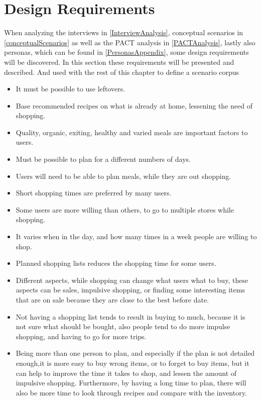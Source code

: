 \section{Design Requirements} \label{DesignRequirements}
When analyzing the interviews in \cref{InterviewAnalysis}, conceptual scenarios in \cref{conceptualScenarios} as well as the PACT analysis in \cref{PACTAnalysis}, lastly also personas, which can be found in \cref{PersonasAppendix}, some design requirements will be discovered. In this section these requirements will be presented and described. And used with the rest of this chapter to define a scenario corpus

\begin{itemize}
  \item It must be possible to use leftovers.
  \item Base recommended recipes on what is already at home, lessening the need of shopping.
  \item Quality, organic, exiting, healthy and varied meals are important factors to users.
  \item Must be possible to plan for a different numbers of days.
  \item Users will need to be able to plan meals, while they are out shopping.
  \item Short shopping times are preferred by many users.
  \item Some users are more willing than others, to go to multiple stores while shopping.
  \item It varies when in the day, and how many times in a week people are willing to shop.
  \item Planned shopping lists reduces the shopping time for some users.
  \item Different aspects, while shopping can change what users what to buy, these aspects can be sales, impulsive shopping, or finding some interesting items that are on sale because they are close to the best before date.
  \item Not having a shopping list tends to result in buying to much, because it is not sure what should be bought, also people tend to do more impulse shopping, and having to go for more trips.
  \item Being more than one person to plan, and especially if the plan is not detailed enough,it is more easy to buy wrong items, or to forget to buy items, but it can help to improve the time it takes to shop, and lessen the amount of impulsive shopping. Furthermore, by having a long time to plan, there will also be more time to look through recipes and compare with the inventory.

\end{itemize}
